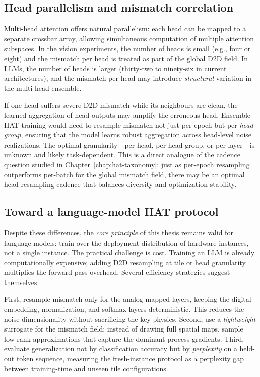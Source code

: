 \subsection{Head parallelism and mismatch correlation}
\label{subsec:lm-heads}

Multi-head attention offers natural parallelism: each head can be mapped to a separate crossbar array, allowing simultaneous computation of multiple attention subspaces.  In the vision experiments, the number of heads is small (e.g., four or eight) and the mismatch per head is treated as part of the global D2D field.  In LLMs, the number of heads is larger (thirty-two to ninety-six in current architectures), and the mismatch per head may introduce \emph{structural} variation in the multi-head ensemble.

If one head suffers severe D2D mismatch while its neighbours are clean, the learned aggregation of head outputs may amplify the erroneous head.  Ensemble HAT training would need to resample mismatch not just per epoch but per \emph{head group}, ensuring that the model learns robust aggregation across head-level noise realizations.  The optimal granularity---per head, per head-group, or per layer---is unknown and likely task-dependent.  This is a direct analogue of the cadence question studied in Chapter~\ref{chap:hat-taxonomy}: just as per-epoch resampling outperforms per-batch for the global mismatch field, there may be an optimal head-resampling cadence that balances diversity and optimization stability.

\subsection{Toward a language-model HAT protocol}
\label{subsec:lm-hat-protocol}

Despite these differences, the \emph{core principle} of this thesis remains valid for language models: train over the deployment distribution of hardware instances, not a single instance.  The practical challenge is cost.  Training an LLM is already computationally expensive; adding D2D resampling at tile or head granularity multiplies the forward-pass overhead.  Several efficiency strategies suggest themselves.

First, resample mismatch only for the analog-mapped layers, keeping the digital embedding, normalization, and softmax layers deterministic.  This reduces the noise dimensionality without sacrificing the key physics.  Second, use a \emph{lightweight} surrogate for the mismatch field: instead of drawing full spatial maps, sample low-rank approximations that capture the dominant process gradients.  Third, evaluate generalization not by classification accuracy but by \emph{perplexity} on a held-out token sequence, measuring the fresh-instance protocol as a perplexity gap between training-time and unseen tile configurations.

